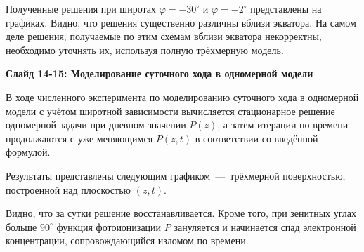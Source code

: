 \documentclass[2pt, a4paper, fleqn]{extarticle}
\begin{document}
Полученные решения при широтах $\varphi = -30^\circ$ и $\varphi=-2^\circ$ представлены на графиках. Видно, что решения существенно различны вблизи экватора. На самом деле решения, получаемые по этим схемам вблизи экватора некорректны, необходимо уточнять их, используя полную трёхмерную модель.

\medskip

{\bf Слайд 14-15: Моделирование суточного хода в одномерной модели}

В ходе численного эксперимента по моделированию суточного хода в одномерной модели с учётом широтной зависимости вычисляется стационарное решение одномерной задачи при дневном значении $P(z)$, а затем итерации по времени продолжаются с уже меняющимся $P(z, t)$ в соответствии со введённой формулой.

Результаты представлены следующим графиком~---~трёхмерной поверхностью, построенной над плоскостью $(z, t)$.

Видно, что за сутки решение восстанавливается. Кроме того, при зенитных углах больше $90^\circ$ функция фотоионизации $P$ зануляется и начинается спад электронной концентрации, сопровождающийся изломом по времени.
\end{document}
